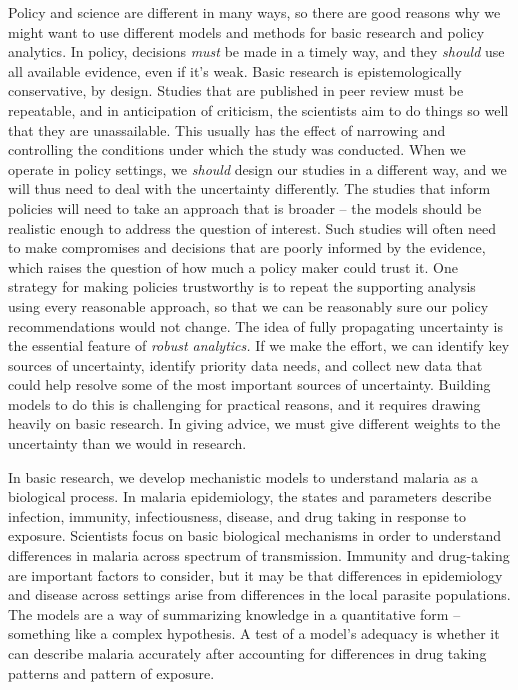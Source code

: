 \documentclass[
]{book}
\begin{document}
Policy and science are different in many ways, so there are good reasons why we might want to use different models and methods for basic research and policy analytics.
In policy, decisions \emph{must} be made in a timely way, and they \emph{should} use all available evidence, even if it's weak.
Basic research is epistemologically conservative, by design.
Studies that are published in peer review must be repeatable, and in anticipation of criticism, the scientists aim to do things so well that they are unassailable.
This usually has the effect of narrowing and controlling the conditions under which the study was conducted.
When we operate in policy settings, we \emph{should} design our studies in a different way, and we will thus need to deal with the uncertainty differently.
The studies that inform policies will need to take an approach that is broader -- the models should be realistic enough to address the question of interest.
Such studies will often need to make compromises and decisions that are poorly informed by the evidence, which raises the question of how much a policy maker could trust it.
One strategy for making policies trustworthy is to repeat the supporting analysis using every reasonable approach, so that we can be reasonably sure our policy recommendations would not change.
The idea of fully propagating uncertainty is the essential feature of \emph{robust analytics.}
If we make the effort, we can identify key sources of uncertainty, identify priority data needs, and collect new data that could help resolve some of the most important sources of uncertainty.
Building models to do this is challenging for practical reasons, and it requires drawing heavily on basic research.
In giving advice, we must give different weights to the uncertainty than we would in research.

In basic research, we develop mechanistic models to understand malaria as a biological process. In malaria epidemiology, the states and parameters describe infection, immunity, infectiousness, disease, and drug taking in response to exposure. Scientists focus on basic biological mechanisms in order to understand differences in malaria across spectrum of transmission. Immunity and drug-taking are important factors to consider, but it may be that differences in epidemiology and disease across settings arise from differences in the local parasite populations. The models are a way of summarizing knowledge in a quantitative form -- something like a complex hypothesis. A test of a model's adequacy is whether it can describe malaria accurately after accounting for differences in drug taking patterns and pattern of exposure.
\end{document}
